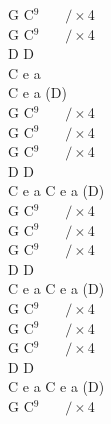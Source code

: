 \documentclass[a5paper, 10pt]{book}
\begin{document}
\begin{minipage}[t]{0.2\textwidth}
G C$^9$ ~~~$/ \times$4\\
G C$^9$ ~~~$/ \times$4\\
D D\\
C e a\\
C e a (D)\\
G C$^9$ ~~~$/ \times$4\\

G C$^9$ ~~~$/ \times$4\\
G C$^9$ ~~~$/ \times$4\\
D D\\
C e a
C e a (D)\\
G C$^9$ ~~~$/ \times$4\\

G C$^9$ ~~~$/ \times$4\\
G C$^9$ ~~~$/ \times$4\\
D D\\
C e a
C e a (D)\\
G C$^9$ ~~~$/ \times$4\\

G C$^9$ ~~~$/ \times$4\\
G C$^9$ ~~~$/ \times$4\\
D D\\
C e a
C e a (D)\\
G C$^9$ ~~~$/ \times$4\\
\end{minipage}

\newpage
\end{document}
